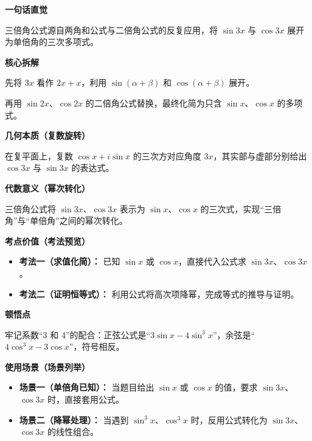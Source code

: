 \begin{explanationbox}

	\textbf{\textcolor{CExplanation}{一句话直觉}}

	三倍角公式源自两角和公式与二倍角公式的反复应用，将 $\sin 3x$ 与 $\cos 3x$ 展开为单倍角的三次多项式。

	\medskip
	\textbf{\textcolor{CExplanation}{核心拆解}}
	\begin{description}[style=nextline, leftmargin=2.8em, labelsep=0.5em, itemsep=0.45em]
		\item[\textbf{要点一（两角和展开）：}] 先将 $3x$ 看作 $2x + x$，利用 $\sin(\alpha+\beta)$ 和 $\cos(\alpha+\beta)$ 展开。
		\item[\textbf{要点二（二倍角代换）：}] 再用 $\sin 2x$、$\cos 2x$ 的二倍角公式替换，最终化简为只含 $\sin x$、$\cos x$ 的多项式。
	\end{description}

	\medskip
	\textbf{\textcolor{CExplanation}{几何本质（复数旋转）}}

	在复平面上，复数 $\cos x + i\sin x$ 的三次方对应角度 $3x$，其实部与虚部分别给出 $\cos 3x$ 与 $\sin 3x$ 的表达式。

	\medskip
	\textbf{\textcolor{CExplanation}{代数意义（幂次转化）}}

	三倍角公式将 $\sin 3x$、$\cos 3x$ 表示为 $\sin x$、$\cos x$ 的三次式，实现“三倍角”与“单倍角”之间的幂次转化。

	\medskip
	\textbf{\textcolor{CExplanation}{考点价值（考法预览）}}
	\begin{itemize}[leftmargin=*, itemsep=0.5em, topsep=0.4em]
		\item \textbf{考法一（求值化简）：} 已知 $\sin x$ 或 $\cos x$，直接代入公式求 $\sin 3x$、$\cos 3x$。
		\item \textbf{考法二（证明恒等式）：} 利用公式将高次项降幂，完成等式的推导与证明。
	\end{itemize}

	\medskip
	\textbf{\textcolor{CExplanation}{顿悟点}}

	牢记系数“3 和 4”的配合：正弦公式是“$3\sin x - 4\sin^3 x$”，余弦是“$4\cos^3 x - 3\cos x$”，符号相反。

	\medskip
	\textbf{\textcolor{CExplanation}{使用场景（场景列举）}}
	\begin{itemize}[leftmargin=*, itemsep=0.5em, topsep=0.4em]
		\item \textbf{场景一（单倍角已知）：} 当题目给出 $\sin x$ 或 $\cos x$ 的值，要求 $\sin 3x$、$\cos 3x$ 时，直接套用公式。
		\item \textbf{场景二（降幂处理）：} 当遇到 $\sin^3 x$、$\cos^3 x$ 时，反用公式转化为 $\sin 3x$、$\cos 3x$ 的线性组合。
	\end{itemize}
\end{explanationbox}
